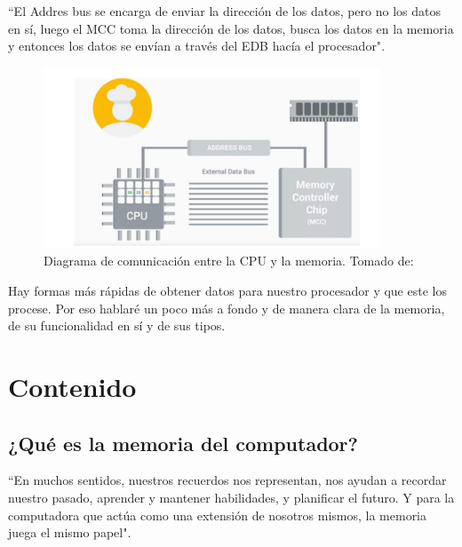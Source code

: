 \documentclass{article}
\begin{document}
 ``El Addres bus se encarga de enviar la dirección de los datos, pero no los datos en sí, luego el MCC toma la dirección de los datos, busca los datos en la memoria y entonces los datos se envían a través del EDB hacía el procesador"\cite[Programs and hardware. 5:51]{Coursera}.

\begin{figure}[h]
\includegraphics[width=10cm]{Captura.1.PNG}
\centering
\caption{Diagrama de comunicación entre la CPU y la memoria. Tomado de:\cite{Coursera}}
\label{Captura.1.PNG}
\end{figure}
Hay formas más rápidas de obtener datos para nuestro procesador y que este los procese. Por eso hablaré un poco más a fondo y de manera clara de la memoria, de su funcionalidad en sí y de sus tipos. 

\section{Contenido} \label{contenido}



\subsection{¿Qué es la memoria del computador?}
 ``En muchos sentidos, nuestros recuerdos nos representan, nos ayudan a recordar nuestro pasado, aprender y mantener habilidades, y planificar el futuro. Y para la computadora que actúa como una extensión de nosotros mismos, la memoria juega el mismo papel"\cite[How computer memory works. 00:06]{TEDwebsite}. 
\vspace{0.2cm}
\end{document}

